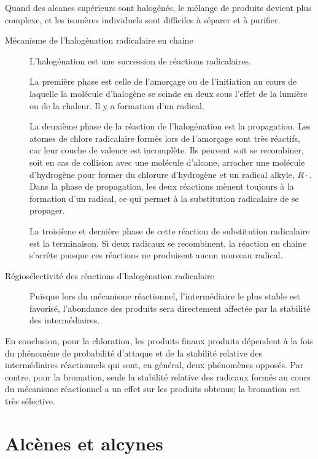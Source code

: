 Quand des alcanes supérieurs sont halogénés, le mélange de produits devient plus complexe, et les isomères individuels sont difficiles à  séparer et à purifier.
\begin{description}
  \item[Mécanisme de l'halogénation radicalaire en chaine]

    L'halogénation est une succession de réactions radicalaires.

    La première phase est celle de l'amorçage ou de l'initiation au cours de laquelle la molécule d'halogène se scinde en deux sous l'effet de la lumière ou de la chaleur.
    Il y a formation d'un radical.

    La deuxième phase de la réaction de l'halogénation est la propagation.
    Les atomes de chlore radicalaire formés lors de l'amorçage sont très réactifs, car leur couche de valence est incomplète.
    Ils peuvent soit se recombiner, soit en cas de collision avec une molécule d'alcane, arracher une molécule d'hydrogène pour former du chlorure d'hydrogène et un radical alkyle, $R \cdot $.
    Dans la phase de propagation, les deux réactions mènent toujours à la formation d'un radical, ce qui permet à la substitution radicalaire de se propager.

    La troisième et dernière phase de cette réaction de substitution radicalaire est la terminaison.
    Si deux radicaux se recombinent, la réaction en chaine s'arrête puisque ces réactions ne produisent aucun nouveau radical.

  \item[Régiosélectivité des réactions d'halogénation radicalaire]

    Puisque lors du mécanisme réactionnel, l'intermédiaire le plus stable est favorisé, l'abondance des produits sera directement affectée par la stabilité des intermédiaires.

\end{description}



En conclusion, pour la chloration, les produits finaux produits dépendent à la fois du phénomène de probabilité d'attaque et de la stabilité relative des intermédiaires réactionnels qui sont, en général, deux phénomènes opposés.
Par contre, pour la bromation, seule la stabilité relative des radicaux formés  au cours du mécanisme réactionnel a un effet sur les produits obtenus; la bromation est très sélective.

\part{Alcènes et alcynes}

